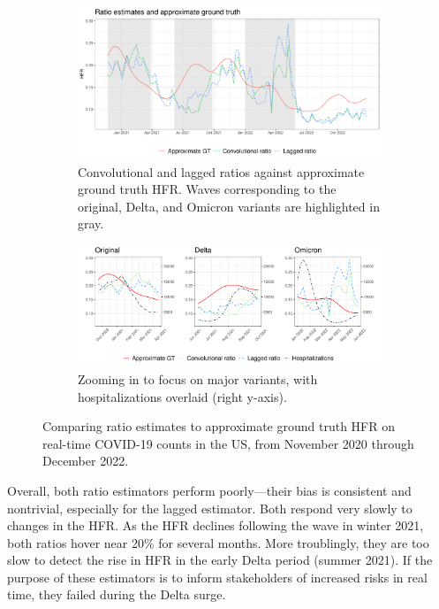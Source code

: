 \documentclass{article}
\begin{document}
\begin{figure}[t!]
\centering
\begin{subfigure}[b]{\linewidth} 
  \centering
  \includegraphics[width=\linewidth]{Figures/Real/US_ests_realtime.pdf}
  \caption{Convolutional and lagged ratios against approximate ground truth
    HFR. Waves corresponding to the original, Delta, and Omicron variants are highlighted in gray. } 
\end{subfigure}

\bigskip
\begin{subfigure}[b]{\linewidth}
  \centering
  \includegraphics[width=\linewidth]{Figures/Real/hfrs_by_wave.pdf}
  \caption{Zooming in to focus on major variants, with hospitalizations overlaid
    (right y-axis).}
\end{subfigure}

\caption{Comparing ratio estimates to approximate ground truth HFR on real-time
  COVID-19 counts in the US, from November 2020 through December 2022.}
\label{fig:basic_est_vs_gt_figs}
\end{figure}

Overall, both ratio estimators perform poorly---their bias is consistent and 
nontrivial, especially for the lagged estimator. Both respond very slowly to
changes in the HFR. As the HFR declines following the wave in winter 2021, both   
ratios hover near 20\% for several months. More troublingly, they are too slow
to detect the rise in HFR in the early Delta period (summer 2021). If the
purpose of these estimators is to inform stakeholders of increased risks in real
time, they failed during the Delta surge.  
\end{document}
